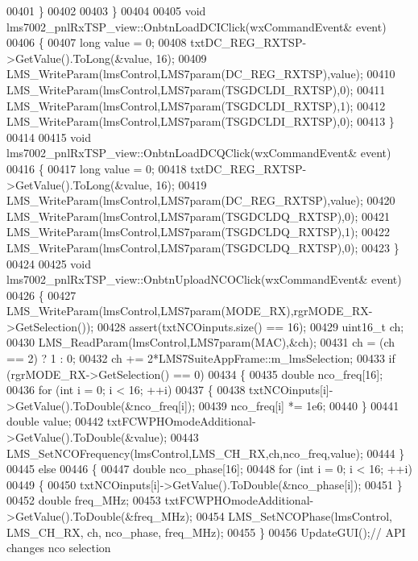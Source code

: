 \begin{DoxyCode}
{{{{{{{{{{{{{00401     \}
00402 
00403 \}
00404 
00405 \textcolor{keywordtype}{void} lms7002_pnlRxTSP_view::OnbtnLoadDCIClick(wxCommandEvent& event)
00406 \{
00407     \textcolor{keywordtype}{long} value = 0;
00408     txtDC_REG_RXTSP->GetValue().ToLong(&value, 16);
00409     LMS_WriteParam(lmsControl,LMS7param(DC_REG_RXTSP),value);
00410     LMS_WriteParam(lmsControl,LMS7param(TSGDCLDI_RXTSP),0);
00411     LMS_WriteParam(lmsControl,LMS7param(TSGDCLDI_RXTSP),1);
00412     LMS_WriteParam(lmsControl,LMS7param(TSGDCLDI_RXTSP),0);
00413 \}
00414 
00415 \textcolor{keywordtype}{void} lms7002_pnlRxTSP_view::OnbtnLoadDCQClick(wxCommandEvent& event)
00416 \{
00417     \textcolor{keywordtype}{long} value = 0;
00418     txtDC_REG_RXTSP->GetValue().ToLong(&value, 16);
00419     LMS_WriteParam(lmsControl,LMS7param(DC_REG_RXTSP),value);
00420     LMS_WriteParam(lmsControl,LMS7param(TSGDCLDQ_RXTSP),0);
00421     LMS_WriteParam(lmsControl,LMS7param(TSGDCLDQ_RXTSP),1);
00422     LMS_WriteParam(lmsControl,LMS7param(TSGDCLDQ_RXTSP),0);
00423 \}
00424 
00425 \textcolor{keywordtype}{void} lms7002_pnlRxTSP_view::OnbtnUploadNCOClick(wxCommandEvent& event)
00426 \{
00427     LMS_WriteParam(lmsControl,LMS7param(MODE_RX),rgrMODE_RX->GetSelection());
00428     assert(txtNCOinputs.size() == 16);
00429     uint16\_t ch;
00430     LMS_ReadParam(lmsControl,LMS7param(MAC),&ch);
00431     ch = (ch == 2) ? 1 : 0;
00432     ch += 2*LMS7SuiteAppFrame::m_lmsSelection;
00433     \textcolor{keywordflow}{if} (rgrMODE_RX->GetSelection() == 0)
00434     \{
00435         \textcolor{keywordtype}{double} nco\_freq[16];
00436         \textcolor{keywordflow}{for} (\textcolor{keywordtype}{int} i = 0; i < 16; ++i)
00437         \{
00438             txtNCOinputs[i]->GetValue().ToDouble(&nco\_freq[i]);
00439             nco\_freq[i] *= 1e6;
00440         \}
00441         \textcolor{keywordtype}{double} value;
00442         txtFCWPHOmodeAdditional->GetValue().ToDouble(&value);
00443         LMS_SetNCOFrequency(lmsControl,LMS_CH_RX,ch,nco\_freq,value);
00444     \}
00445     \textcolor{keywordflow}{else}
00446     \{
00447         \textcolor{keywordtype}{double} nco\_phase[16];
00448         \textcolor{keywordflow}{for} (\textcolor{keywordtype}{int} i = 0; i < 16; ++i)
00449         \{
00450             txtNCOinputs[i]->GetValue().ToDouble(&nco\_phase[i]);
00451         \}
00452         \textcolor{keywordtype}{double} freq\_MHz;
00453         txtFCWPHOmodeAdditional->GetValue().ToDouble(&freq\_MHz);
00454         LMS_SetNCOPhase(lmsControl, LMS_CH_RX, ch, nco\_phase, freq\_MHz);
00455     \}
00456     UpdateGUI();\textcolor{comment}{// API changes nco selection}
}}}}}}}}}}}}}
\end{DoxyCode}
